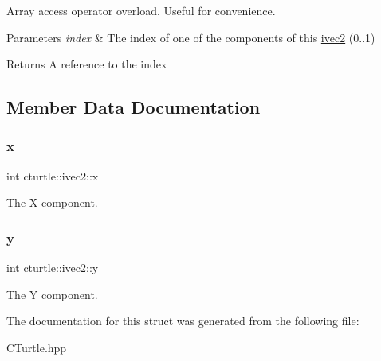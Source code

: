 Array access operator overload. Useful for convenience. 


\begin{DoxyParams}{Parameters}
{\em index} & The index of one of the components of this \hyperlink{structcturtle_1_1ivec2}{ivec2} (0..1) \\
\hline
\end{DoxyParams}
\begin{DoxyReturn}{Returns}
A reference to the index 
\end{DoxyReturn}


\subsection{Member Data Documentation}
\mbox{\label{structcturtle_1_1ivec2_acf8e72e8e3847b3a62f35bfbe588b637}} 
\subsubsection{\texorpdfstring{x}{x}}
{\footnotesize\ttfamily int cturtle\+::ivec2\+::x}

The X component. \mbox{\label{structcturtle_1_1ivec2_a20914f8516f2f9b8e88e81cdf8415897}} 
\subsubsection{\texorpdfstring{y}{y}}
{\footnotesize\ttfamily int cturtle\+::ivec2\+::y}

The Y component. 

The documentation for this struct was generated from the following file\+:\begin{DoxyCompactItemize}
\item 
C\+Turtle.\+hpp\end{DoxyCompactItemize}
